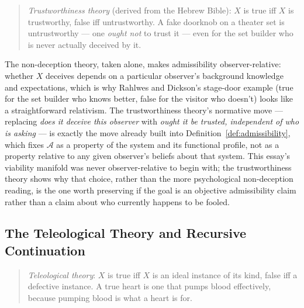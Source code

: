 \documentclass[11pt,a4paper]{article}
\theoremstyle{plain}
\theoremstyle{definition}
\theoremstyle{remark}
\newcommand{\Adm}{\mathcal{A}}
\begin{document}
\begin{quote}
\emph{Trustworthiness theory} (derived from the Hebrew Bible): $X$ is true iff $X$ is trustworthy, false iff untrustworthy. A fake doorknob on a theater set is untrustworthy — one \emph{ought not} to trust it — even for the set builder who is never actually deceived by it.
\end{quote}

The non-deception theory, taken alone, makes admissibility observer-relative: whether $X$ deceives depends on a particular observer's background knowledge and expectations, which is why Rahlwes and Dickson's stage-door example (true for the set builder who knows better, false for the visitor who doesn't) looks like a straightforward relativism. The trustworthiness theory's normative move — replacing \emph{does it deceive this observer} with \emph{ought it be trusted, independent of who is asking} — is exactly the move already built into Definition~\ref{def:admissibility}, which fixes $\Adm$ as a property of the system and its functional profile, not as a property relative to any given observer's beliefs about that system. This essay's viability manifold was never observer-relative to begin with; the trustworthiness theory shows why that choice, rather than the more psychological non-deception reading, is the one worth preserving if the goal is an objective admissibility claim rather than a claim about who currently happens to be fooled.

\subsection{The Teleological Theory and Recursive Continuation}
\label{subsec:teleological-continuation}

\begin{quote}
\emph{Teleological theory}: $X$ is true iff $X$ is an ideal instance of its kind, false iff a defective instance. A true heart is one that pumps blood effectively, because pumping blood is what a heart is for.
\end{quote}
\end{document}
